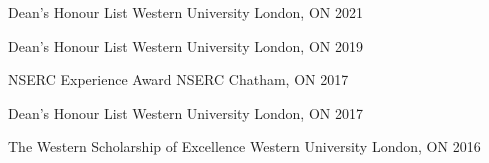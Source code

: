 



\begin{cvawards}

  \cvaward
    {Dean's Honour List} %
    {Western University} %
    {London, ON} %
    {2021} %

  \cvaward
    {Dean's Honour List} %
    {Western University} %
    {London, ON} %
    {2019} %

  \cvaward
    {NSERC Experience Award} %
    {NSERC} %
    {Chatham, ON} %
    {2017} %

  \cvaward
    {Dean's Honour List} %
    {Western University} %
    {London, ON} %
    {2017} %

  \cvaward
    {The Western Scholarship of Excellence} %
    {Western University} %
    {London, ON} %
    {2016} %

\end{cvawards}




